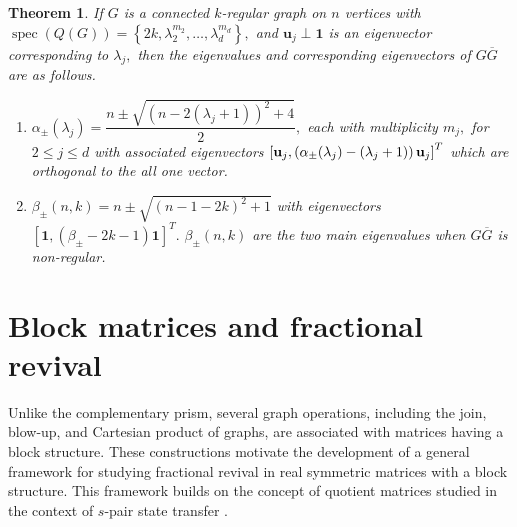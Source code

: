 \documentclass[12pt,a4paper]{article}
\newtheorem{thm}{Theorem}
\def \u {{\bf u}}
\newcommand{\ob}[1]{\left(#1\right)}
\newcommand{\cb}[1]{\left\lbrace #1\right\rbrace}
\newcommand{\tb}[1]{\left[#1\right]}
\begin{document}
\begin{thm}\cite{card1}\label{5t5}
    If $G$ is a connected $k$-regular graph on $n$ vertices with $\operatorname{spec}(Q(G))=\cb{2k, \lambda_2^{m_2},\ldots, \lambda_d^{m_d}},$  and $\mathbf{u}_j\perp \mathbf{1}$ is an  eigenvector corresponding to $\lambda_j,$ then the eigenvalues and corresponding eigenvectors of $G\overline{G}$ are as follows.
\begin{enumerate}[label=(\roman*)]
        \item $\alpha_{\pm}(\lambda_j)=\dfrac{n\pm\sqrt{\ob{n-2(\lambda_j+1)}^2+4}}{2},$ each with multiplicity $m_j,$ for $2\leq j\leq d$ with associated eigenvectors $\tb{
            \u_j,
            \ob{\alpha_{\pm}(\lambda_j)-(\lambda_j+1)}\u_j}^T$ which are orthogonal to the all one vector.
        
        \item$\beta_{\pm}(n,k)=n\pm\sqrt{(n-1-2k)^2+1}$ with eigenvectors $\tb{
            \mathbf{1},
            \ob{\beta_{\pm}-2k-1}\mathbf{1}}^T.$ $\beta_{\pm}(n,k)$ are the two main eigenvalues when $G\overline{G}$ is non-regular.

\end{enumerate}
\end{thm}

 \section{Block matrices and fractional revival}\label{6s3}
Unlike the complementary prism, several graph operations, including the join, blow-up, and Cartesian product of graphs, are associated with matrices having a block structure. These constructions motivate the development of a general framework for studying fractional revival in real symmetric matrices with a block structure. This framework builds on the concept of quotient matrices studied in the context of $s$-pair state transfer \cite{kim}.
\end{document}
